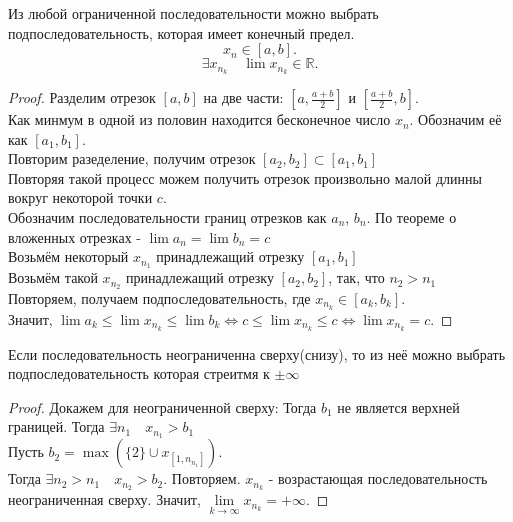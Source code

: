 \documentclass[11pt, oneside]{article}   	%
\begin{document}
    \begin{theorem} \label{bolz-weier}
        Из любой ограниченной последовательности можно выбрать подпоследовательность, которая имеет конечный предел.\\
        \[ x_n\in \left[a, b\right] .\]
        \[ \exists{x_{n_k}}\quad \lim x_{n_k}\in \mathbb{R} .\] 
        \begin{proof}
            Разделим отрезок $\left[a,b\right]$ на две части: $\left[a, \frac{a+b}{2}\right]$ и $ \left[\frac{a+b}{2}, b\right]$.\\
            Как минмум в одной из половин находится бесконечное число $x_n$. Обозначим её как $ \left[a_1, b_1\right]$.\\
            Повторим разеделение, получим отрезок $ \left[a_2, b_2\right] \subset [a_1, b_1]$\\
            Повторяя такой процесс можем получить отрезок произвольно малой длинны вокруг некоторой точки $c$.\\
            Обозначим последовательности границ отрезков как $a_n$, $b_n$. По теореме о вложенных отрезках -  $\lim a_n = \lim b_n = c$\\
            Возьмём некоторый $x_{n_1}$ принадлежащий отрезку $ \left[a_1,b_1\right]$\\
            Возьмём такой $x_{n_2}$ принадлежащий отрезку $ \left[a_2, b_2\right]$, так, что $n_2>n_1$\\
            Повторяем, получаем подпоследовательность, где $x_{n_k}\in \left[a_k, b_k\right]$.\\
            Значит, $\lim a_k \le \lim x_{n_k} \le \lim b_k \iff c \le \lim x_{n_k} \le c \iff \lim x_{n_k} = c$.
        \end{proof}
    \end{theorem}
    \begin{tlemma}
        Если последовательность неограниченна сверху(снизу), то из неё можно выбрать подпоследовательность которая стреитмя к $\pm\infty$
        \begin{proof}
           Докажем для неограниченной сверху:
           Тогда $b_1$ не является верхней границей. Тогда $\exists{n_1}\quad x_{n_1} > b_1 $ \\
           Пусть $b_2 = \max\left( \{2\} \cup x_{\left[1, n_{n_1}\right]}  \right) $.\\
           Тогда $\exists{n_2 > n_1}\quad x_{n_2} > b_2$.
           Повторяем. $x_{n_k}$ - возрастающая последовательность неограниченная сверху. Значит, $\lim\limits_{k\to \infty} x_{n_k} = +\infty$. 
        \end{proof}
    \end{tlemma}
\end{document}
